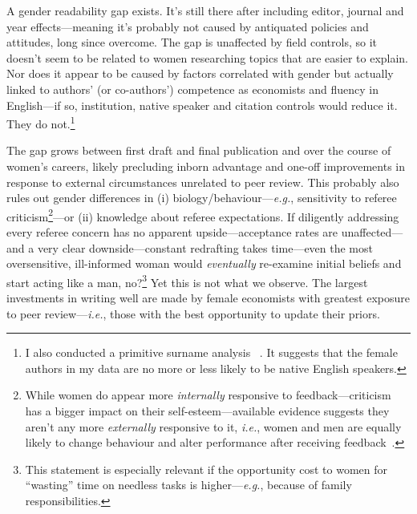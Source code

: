 \begin{appendices}
\begin{refsection}
A gender readability gap exists. It's still there after including editor, journal and year effects---meaning it's probably not caused by antiquated policies and attitudes, long since overcome. The gap is unaffected by field controls, so it doesn't seem to be related to women researching topics that are easier to explain. Nor does it appear to be caused by factors correlated with gender but actually linked to authors' (or co-authors') competence as economists and fluency in English---if so, institution, native speaker and citation controls would reduce it. They do not.\footnote{I also conducted a primitive surname analysis ~\citep[see][pp. 35--36]{Hengel2016}. It suggests that the female authors in my data are no more or less likely to be native English speakers.}

The gap grows between first draft and final publication and over the course of women's careers, likely precluding inborn advantage and one-off improvements in response to external circumstances unrelated to peer review. This probably also rules out gender differences in (i) biology\slash behaviour---\emph{e.g.}, sensitivity to referee criticism\footnote{While women do appear more \emph{internally} responsive to feedback---criticism has a bigger impact on their self-esteem---available evidence suggests they aren't any more \emph{externally} responsive to it, \emph{i.e.}, women and men are equally likely to change behaviour and alter performance after receiving feedback~\citep{Johnson2002,Roberts1989}.}---or (ii) knowledge about referee expectations. If diligently addressing every referee concern has no apparent upside---acceptance rates are unaffected---and a very clear downside---constant redrafting takes time---even the most oversensitive, ill-informed woman would \emph{eventually} re-examine initial beliefs and start acting like a man, no?\footnote{This statement is especially relevant if the opportunity cost to women for ``wasting'' time on needless tasks is higher---\emph{e.g.}, because of family responsibilities.} Yet this is not what we observe. The largest investments in writing well are made by female economists with greatest exposure to peer review---\emph{i.e.}, those with the best opportunity to update their priors.


\end{refsection}
\end{appendices}
